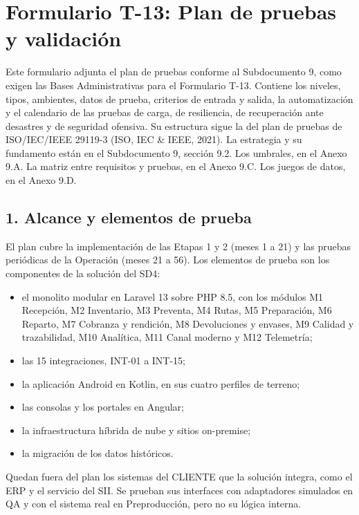 \chapter{Formulario T-13: Plan de pruebas y validación}\label{cap:sd9-t13}

Este formulario adjunta el plan de pruebas conforme al Subdocumento 9, como exigen las Bases Administrativas para el Formulario T-13. Contiene los niveles, tipos, ambientes, datos de prueba, criterios de entrada y salida, la automatización y el calendario de las pruebas de carga, de resiliencia, de recuperación ante desastres y de seguridad ofensiva. Su estructura sigue la del plan de pruebas de ISO/IEC/IEEE 29119-3 (ISO, IEC \& IEEE, 2021). La estrategia y su fundamento están en el Subdocumento 9, sección 9.2. Los umbrales, en el Anexo 9.A. La matriz entre requisitos y pruebas, en el Anexo 9.C. Los juegos de datos, en el Anexo 9.D.

\section*{1. Alcance y elementos de prueba}

El plan cubre la implementación de las Etapas 1 y 2 (meses 1 a 21) y las pruebas periódicas de la Operación (meses 21 a 56). Los elementos de prueba son los componentes de la solución del SD4:

\begin{itemize}
\item el monolito modular en Laravel 13 sobre PHP 8.5, con los módulos M1 Recepción, M2 Inventario, M3 Preventa, M4 Rutas, M5 Preparación, M6 Reparto, M7 Cobranza y rendición, M8 Devoluciones y envases, M9 Calidad y trazabilidad, M10 Analítica, M11 Canal moderno y M12 Telemetría;
\item las 15 integraciones, INT-01 a INT-15;
\item la aplicación Android en Kotlin, en sus cuatro perfiles de terreno;
\item las consolas y los portales en Angular;
\item la infraestructura híbrida de nube y sitios on-premise;
\item la migración de los datos históricos.
\end{itemize}

Quedan fuera del plan los sistemas del CLIENTE que la solución integra, como el ERP y el servicio del SII. Se prueban sus interfaces con adaptadores simulados en QA y con el sistema real en Preproducción, pero no su lógica interna.

